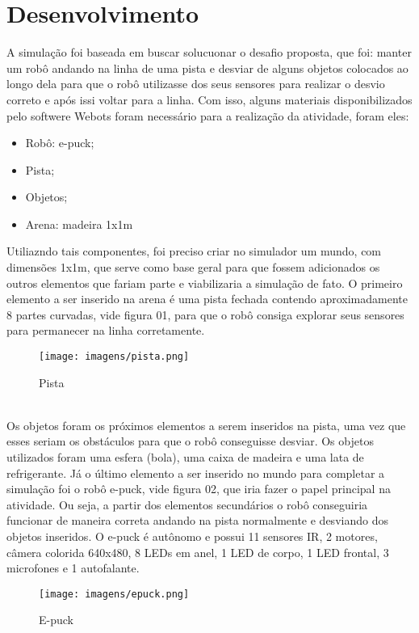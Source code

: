 \documentclass[11pt, a4paper, twocolumn]{article}
\begin{document}
\section{Desenvolvimento}
    A simulação foi baseada em buscar solucuonar o desafio proposta, que foi: manter um robô andando na linha de uma pista e desviar de alguns objetos colocados ao longo dela para 
    que o robô utilizasse dos seus sensores para realizar o desvio correto e após issi voltar para a linha. Com isso, alguns materiais disponibilizados pelo softwere Webots foram 
    necessário para a realização da atividade, foram eles:
    \begin{itemize}
        \item Robô: e-puck;
        \item Pista;
        \item Objetos;
        \item Arena: madeira 1x1m
    \end{itemize}
    Utiliazndo tais componentes, foi preciso criar no simulador um mundo, com dimensões 1x1m, que serve como base geral para que fossem adicionados os outros elementos que fariam parte 
    e viabilizaria a simulação de fato. O primeiro elemento a ser inserido na arena é uma pista fechada contendo aproximadamente 8 partes curvadas, vide figura 01, para que o robô consiga 
    explorar seus sensores para permanecer na linha corretamente.
    \begin{figure}[h]
        \caption{Pista}
        \centering
        \texttt{[image: imagens/pista.png]}
    \end{figure}
    \\
    Os objetos foram os próximos elementos a serem inseridos na pista, uma vez que esses seriam os obstáculos para que o robô conseguisse desviar. Os objetos utilizados foram uma esfera (bola), 
    uma caixa de madeira e uma lata de refrigerante. Já o último elemento a ser inserido no mundo para completar a simulação foi o robô e-puck, vide figura 02, que iria fazer o papel principal na 
    atividade. Ou seja, a partir dos elementos secundários o robô conseguiria funcionar de maneira correta andando na pista normalmente e desviando dos objetos inseridos. O e-puck é autônomo e 
    possui 11 sensores IR, 2 motores, câmera colorida 640x480, 8 LEDs em anel, 1 LED de corpo, 1 LED frontal, 3 microfones e 1 autofalante.
    \begin{figure}[h]
        \caption{E-puck}
        \centering
        \texttt{[image: imagens/epuck.png]}
    \end{figure}
\end{document}

